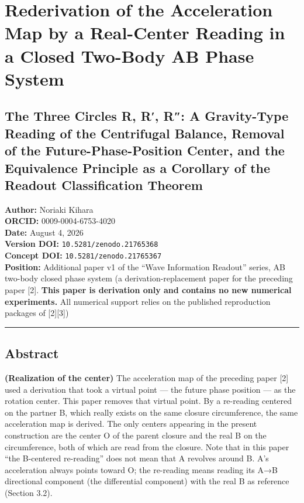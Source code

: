 \documentclass[
  a4paper,
]{article}
\author{}
\date{}
\begin{document}
\section{Rederivation of the Acceleration Map by a Real-Center Reading
in a Closed Two-Body AB Phase
System}\label{rederivation-of-the-acceleration-map-by-a-real-center-reading-in-a-closed-two-body-ab-phase-system}

\subsection{The Three Circles R, R′, R″: A Gravity-Type Reading of the
Centrifugal Balance, Removal of the Future-Phase-Position Center, and
the Equivalence Principle as a Corollary of the Readout Classification
Theorem}\label{the-three-circles-r-r-r-a-gravity-type-reading-of-the-centrifugal-balance-removal-of-the-future-phase-position-center-and-the-equivalence-principle-as-a-corollary-of-the-readout-classification-theorem}

\textbf{Author:} Noriaki Kihara\\
\textbf{ORCID:} 0009-0004-6753-4020\\
\textbf{Date:} August 4, 2026\\
\textbf{Version DOI:} \texttt{10.5281/zenodo.21765368}\\
\textbf{Concept DOI:} \texttt{10.5281/zenodo.21765367}\\
\textbf{Position:} Additional paper v1 of the ``Wave Information
Readout'' series, AB two-body closed phase system (a
derivation-replacement paper for the preceding paper {[}2{]}.
\textbf{This paper is derivation only and contains no new numerical
experiments.} All numerical support relies on the published reproduction
packages of {[}2{]}{[}3{]})

\begin{center}\rule{0.5\linewidth}{0.5pt}\end{center}

\subsection{Abstract}\label{abstract}

\textbf{(Realization of the center)} The acceleration map of the
preceding paper {[}2{]} used a derivation that took a virtual point ---
the future phase position --- as the rotation center. This paper removes
that virtual point. By a re-reading centered on the partner B, which
really exists on the same closure circumference, the same acceleration
map is derived. The only centers appearing in the present construction
are the center O of the parent closure and the real B on the
circumference, both of which are read from the closure. Note that in
this paper ``the B-centered re-reading'' does not mean that A revolves
around B. A's acceleration always points toward O; the re-reading means
reading its A→B directional component (the differential component) with
the real B as reference (Section 3.2).
\end{document}
